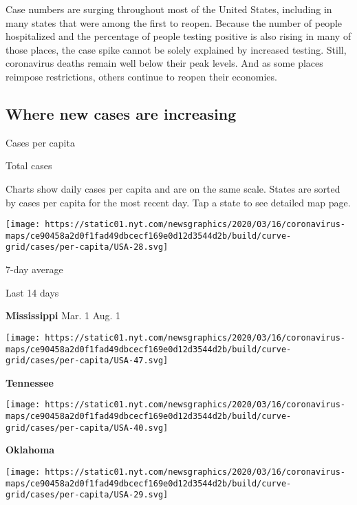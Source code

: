 Case numbers are surging throughout most of the United States, including
in many states that were among the first to reopen. Because the number
of people hospitalized and the percentage of people testing positive is
also rising in many of those places, the case spike cannot be solely
explained by increased testing. Still, coronavirus deaths remain well
below their peak levels. And as some places reimpose restrictions,
others continue to reopen their economies.

\hypertarget{where-new-cases-are-increasing}{%
\subsection{Where new cases are
increasing}\label{where-new-cases-are-increasing}}

Cases per capita

Total cases

Charts show daily cases per capita and are on the same scale. States are
sorted by cases per capita for the most recent day. Tap a state to see
detailed map page.

\href{https://www.nytimes.com/interactive/2020/us/mississippi-coronavirus-cases.html}{}

\texttt{[image: https://static01.nyt.com/newsgraphics/2020/03/16/coronavirus-maps/ce90458a2d0f1fad49dbcecf169e0d12d3544d2b/build/curve-grid/cases/per-capita/USA-28.svg]}

7-day average

Last 14 days

\textbf{Mississippi} Mar. 1 Aug. 1

\href{https://www.nytimes.com/interactive/2020/us/tennessee-coronavirus-cases.html}{}

\texttt{[image: https://static01.nyt.com/newsgraphics/2020/03/16/coronavirus-maps/ce90458a2d0f1fad49dbcecf169e0d12d3544d2b/build/curve-grid/cases/per-capita/USA-47.svg]}

\textbf{Tennessee}

\href{https://www.nytimes.com/interactive/2020/us/oklahoma-coronavirus-cases.html}{}

\texttt{[image: https://static01.nyt.com/newsgraphics/2020/03/16/coronavirus-maps/ce90458a2d0f1fad49dbcecf169e0d12d3544d2b/build/curve-grid/cases/per-capita/USA-40.svg]}

\textbf{Oklahoma}

\href{https://www.nytimes.com/interactive/2020/us/missouri-coronavirus-cases.html}{}

\texttt{[image: https://static01.nyt.com/newsgraphics/2020/03/16/coronavirus-maps/ce90458a2d0f1fad49dbcecf169e0d12d3544d2b/build/curve-grid/cases/per-capita/USA-29.svg]}

